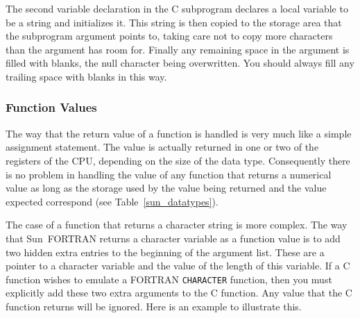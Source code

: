 \documentclass[twoside,11pt,nolof]{starlink}
\begin{document}
The second variable declaration in the C subprogram declares a local variable
to be a string and initializes it. This string is then copied to the storage
area that the subprogram argument points to, taking care not to copy more
characters than the argument has room for. Finally any remaining space in the
argument is filled with blanks, the null character being overwritten. You
should always fill any trailing space with blanks in this way.

\subsubsection{Function Values}

The way that the return value of a function is handled is very much like a
simple assignment statement. The value is actually returned in one or two of
the registers of the CPU, depending on the size of the data type. Consequently
there is no problem in handling the value of any function that returns a
numerical value as long as the storage used by the value being returned and the
value expected correspond
(see Table~\ref{sun_datatypes}).

The case of a function that returns a character string is more complex. The way
that Sun~FORTRAN returns a character variable as a function value is to add two
hidden extra entries to the beginning of the argument list. These are a pointer
to a character variable and the value of the length of this variable. If a C
function wishes to emulate a FORTRAN \texttt{CHARACTER} function, then you must
explicitly add these two extra arguments to the C function. Any value that the
C function returns will be ignored. Here is an example to illustrate this.
\end{document}
